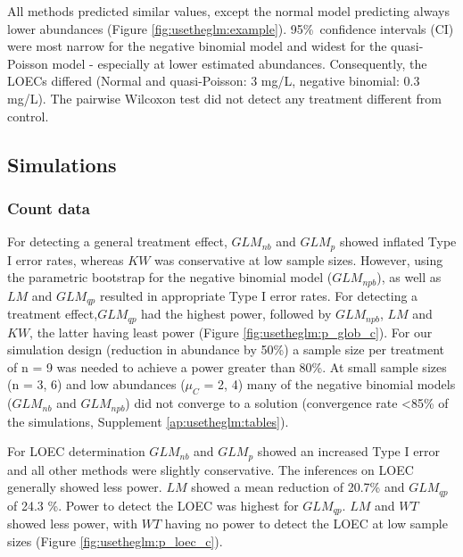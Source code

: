 All methods predicted similar values, except the normal model predicting always lower abundances (Figure \ref{fig:usetheglm:example}). 
95\%~confidence intervals (CI) were most narrow for the negative binomial model and widest for the quasi-Poisson model - especially at lower estimated abundances.
Consequently, the LOECs differed (Normal and quasi-Poisson: 3 mg/L, negative binomial: 0.3 mg/L).
The pairwise Wilcoxon test did not detect any treatment different from control.


\subsection{Simulations}
\subsubsection{Count data}
For detecting a general treatment effect, $GLM_{nb}$ and $GLM_{p}$ showed inflated Type I error rates, whereas $KW$ was conservative at low sample sizes.
However, using the parametric bootstrap for the negative binomial model ($GLM_{npb}$), as well as $LM$ and $GLM_{qp}$ resulted in appropriate Type I error rates.
For detecting a treatment effect,$GLM_{qp}$ had the highest power, followed by $GLM_{npb}$, $LM$ and $KW$, the latter having least power (Figure \ref{fig:usetheglm:p_glob_c}).
For our simulation design (reduction in abundance by 50\%) a sample size per treatment of n = 9 was needed to achieve a power greater than 80\%.
At small sample sizes (n = {3, 6}) and low abundances ($\mu_C$ = {2, 4}) many of the negative binomial models ($GLM_{nb}$ and $GLM_{npb}$) did not converge to a solution (convergence rate \textless 85\% of the simulations, Supplement  \ref{ap:usetheglm:tables}). 

For LOEC determination $GLM_{nb}$ and $GLM_{p}$ showed an increased Type I error and all other methods were slightly conservative.
The inferences on LOEC generally showed less power.
$LM$ showed a mean reduction of 20.7\% and $GLM_{qp}$ of 24.3 \%.
Power to detect the LOEC was highest for $GLM_{qp}$. 
$LM$ and $WT$ showed less power, with $WT$ having no power to detect the LOEC at low sample sizes (Figure \ref{fig:usetheglm:p_loec_c}).

